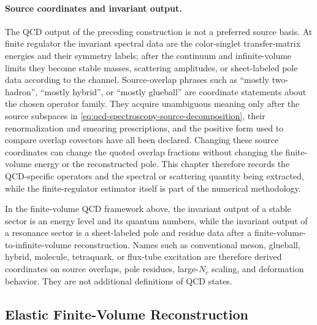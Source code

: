 \paragraph{Source coordinates and invariant output.}
The QCD output of the preceding construction is not a preferred source basis.
At finite regulator the invariant spectral data are the color-singlet
transfer-matrix energies and their symmetry labels; after the continuum and
infinite-volume limits they become stable masses, scattering amplitudes, or
sheet-labeled pole data according to the channel.  Source-overlap phrases such
as ``mostly two-hadron'', ``mostly hybrid'', or ``mostly glueball'' are
coordinate statements about the chosen operator family.  They acquire
unambiguous meaning only after the source subspaces in
\eqref{eq:qcd-spectroscopy-source-decomposition}, their renormalization and
smearing prescriptions, and the positive form used to compare overlap
covectors have all been declared.  Changing these source coordinates can
change the quoted overlap fractions without changing the finite-volume energy
or the reconstructed pole.  This chapter therefore records the QCD-specific
operators and the spectral or scattering quantity being extracted, while the
finite-regulator estimator itself is part of the numerical methodology.

\begin{remark}
\label{rem:qcd-spectroscopic-names-derived}
In the finite-volume QCD framework above, the invariant output of a stable
sector is an energy level and its quantum numbers, while the invariant output
of a resonance sector is a sheet-labeled pole and residue data after a
finite-volume-to-infinite-volume reconstruction.  Names such as conventional
meson, glueball, hybrid, molecule, tetraquark, or flux-tube excitation are
therefore derived coordinates on source overlaps, pole residues, large-\(N_c\)
scaling, and deformation behavior.  They are not additional definitions of
QCD states.
\end{remark}

\subsection{Elastic Finite-Volume Reconstruction}
\label{subsec:qcd-elastic-finite-volume-reconstruction}

